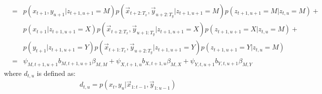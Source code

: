 \begin{eqnarray}
            &=& p(x_{t+1}, y_{u+1}|z_{t+1, u+1}=M)p(\vec{x}_{t+2:T_x}, \vec{y}_{u+2:T_y}|z_{t+1, u+1}=M) p(z_{t+1, u+1} = M| z_{t, u}= M) +\nonumber \\ 
            && p(x_{t+1}|z_{t+1, u+1}=X)p(\vec{x}_{t+2:T_x}, \vec{y}_{u+1:T_y}|z_{t+1, u+1}=X) p(z_{t+1, u+1} = X| z_{t, u}= M) + \nonumber \\ 
            && p(y_{t+1}|z_{t+1, u+1}=Y)p(\vec{x}_{t+1:T_x}, \vec{y}_{u+2:T_y}|z_{t+1, u+1}=Y) p(z_{t+1, u+1} = Y| z_{t, u}= M) \nonumber \\ 
            &=& \psi_{M, t+1, u+1} b_{M, t+1, u+1} \beta_{M,M} + \psi_{X, t+1, u} b_{X, t+1, u} \beta_{M,X} + \psi_{Y, t, u+1} b_{Y, t, u+1} \beta_{M,Y}
\end{eqnarray}
where $d_{t,u}$ is defined as:
\begin{eqnarray}
  d_{t,u} = {p(x_t, y_u | \vec{x}_{1:t-1}, \vec{y}_{1:u-1})} 
\end{eqnarray}



